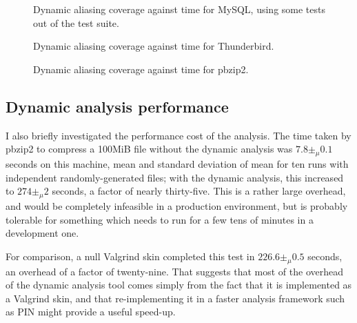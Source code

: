 \begin{figure}
  \caption{Dynamic aliasing coverage against time for MySQL, using
    some tests out of the test suite.}
  \label{fig:eval:dyn_convergence:mysqld}
\end{figure}

\begin{figure}
  
  \caption{Dynamic aliasing coverage against time for Thunderbird.}
  \label{fig:eval:dyn_convergence:thunderbird}
\end{figure}

\begin{figure}
  
  \caption{Dynamic aliasing coverage against time for pbzip2.}
  \label{fig:eval:dyn_convergence:pbzip2}
\end{figure}

\subsection{Dynamic analysis performance}

I also briefly investigated the performance cost of the analysis.  The
time taken by pbzip2 to compress a 100MiB file without the dynamic
analysis was $7.8 \pm_\mu 0.1$ seconds on this machine, mean and standard
deviation of mean for ten runs with independent randomly-generated
files; with the dynamic analysis, this increased to $274 \pm_\mu 2$
seconds, a factor of nearly thirty-five.  This is a rather large
overhead, and would be completely infeasible in a production
environment, but is probably tolerable for something which needs to
run for a few tens of minutes in a development one.

For comparison, a null Valgrind skin completed this test in $226.6
\pm_\mu 0.5$ seconds, an overhead of a factor of twenty-nine.  That
suggests that most of the overhead of the dynamic analysis tool comes
simply from the fact that it is implemented as a Valgrind skin, and
that re-implementing it in a faster analysis framework such as
PIN\cite{Luk2005} might provide a useful speed-up.

